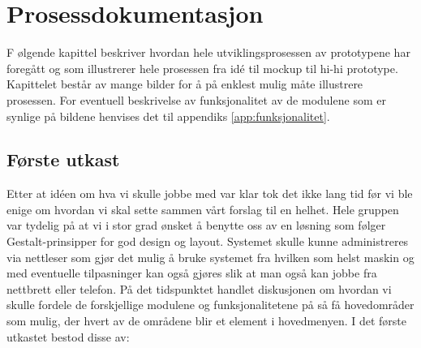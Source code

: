 \chapter{Prosessdokumentasjon}
\lettrine[lines=2]{F}{} ølgende kapittel beskriver hvordan hele utviklingsprosessen av prototypene har foregått og som illustrerer hele prosessen fra idé til mockup til hi-hi prototype. Kapittelet består av mange bilder for å på enklest mulig måte illustrere prosessen. For eventuell beskrivelse av funksjonalitet av de modulene som er synlige på bildene henvises det til appendiks \ref{app:funksjonalitet}.




\section{Første utkast} \label{sec:utkast}
Etter at idéen om hva vi skulle jobbe med var klar tok det ikke lang tid før vi ble enige om hvordan vi skal sette sammen vårt forslag til en helhet. Hele gruppen var tydelig på at vi i stor grad ønsket å benytte oss av en løsning som følger Gestalt-prinsipper for god design og layout.
Systemet skulle kunne administreres via nettleser som gjør det mulig å bruke systemet fra hvilken som helst maskin og med eventuelle tilpasninger kan også gjøres slik at man også kan jobbe fra nettbrett eller telefon.
På det tidspunktet handlet diskusjonen om hvordan vi skulle fordele de forskjellige modulene og funksjonalitetene på så få hovedområder som mulig, der hvert av de områdene blir et element i hovedmenyen. 
I det første utkastet bestod disse av:
